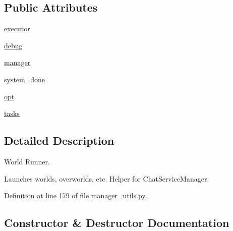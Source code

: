 \subsection*{Public Attributes}
\begin{DoxyCompactItemize}
\item 
\hyperlink{classparlai_1_1chat__service_1_1core_1_1manager__utils_1_1ChatServiceWorldRunner_aa9cd644d7c035fcb41980005d259947f}{executor}
\item 
\hyperlink{classparlai_1_1chat__service_1_1core_1_1manager__utils_1_1ChatServiceWorldRunner_af71184b9bb3dc433adfd678b7a8097e7}{debug}
\item 
\hyperlink{classparlai_1_1chat__service_1_1core_1_1manager__utils_1_1ChatServiceWorldRunner_aebacdd9b5d3ab6a093945f22e0fe0a83}{manager}
\item 
\hyperlink{classparlai_1_1chat__service_1_1core_1_1manager__utils_1_1ChatServiceWorldRunner_a4fcbda4053e9103d38301f0039674ed9}{system\+\_\+done}
\item 
\hyperlink{classparlai_1_1chat__service_1_1core_1_1manager__utils_1_1ChatServiceWorldRunner_aa4e0d4e5b87f4c136b0750cea2c339be}{opt}
\item 
\hyperlink{classparlai_1_1chat__service_1_1core_1_1manager__utils_1_1ChatServiceWorldRunner_a09f6b502ea55829cd883a8ef4e9ac6d4}{tasks}
\end{DoxyCompactItemize}


\subsection{Detailed Description}
\begin{DoxyVerb}World Runner.

Launches worlds, overworlds, etc. Helper for ChatServiceManager.
\end{DoxyVerb}
 

Definition at line 179 of file manager\+\_\+utils.\+py.



\subsection{Constructor \& Destructor Documentation}
\mbox{\label{classparlai_1_1chat__service_1_1core_1_1manager__utils_1_1ChatServiceWorldRunner_a01462412e195b5788e5cfd3a769f0c0d}} 
